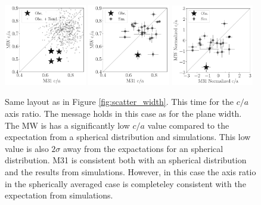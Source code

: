 \documentclass[a4paper,fleqn,usenatbib]{mnras}
\begin{document}
\begin{figure}
\centering
\includegraphics[width=0.32\textwidth]{scatter_random_ranked_ca_ratio.pdf}
\includegraphics[width=0.32\textwidth]{scatter_ranked_ca_ratio.pdf}
\includegraphics[width=0.32\textwidth]{scatter_norm_ca_ratio.pdf}
\caption{Same layout as in Figure \ref{fig:scatter_width}. 
This time for the $c/a$ axis ratio. 
The message holds in this case as for the plane width.
The MW is has a significantly low $c/a$ value compared to the
expectation from a spherical distribution and simulations. 
This low value is also $2\sigma$ away from the expactations for an
spherical distribution.
M31 is consistent both with an spherical distribution and the results
from simulations.
However, in this case the axis ratio in the spherically averaged case
is completeley consistent with the expectation from simulations.
\label{fig:scatter_ca_ration}}
\end{figure}
\end{document}
